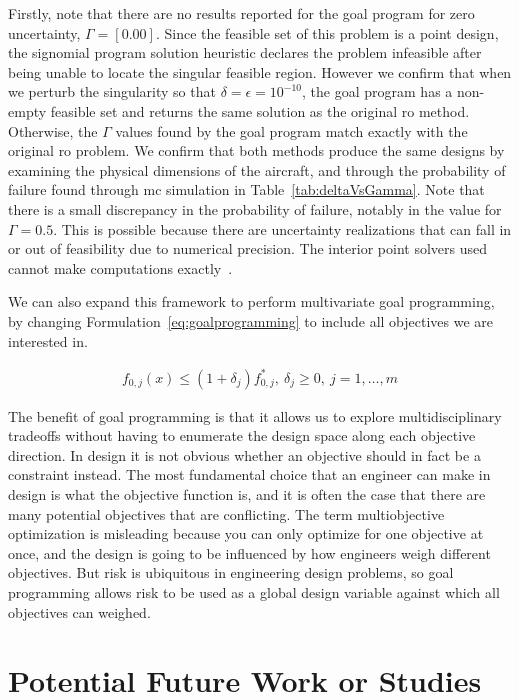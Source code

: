 Firstly, note that there are no results reported for the goal program
for zero uncertainty, $\Gamma = [0.00]$.
Since the feasible set of this problem is a point design, the signomial program
solution heuristic declares the problem infeasible after being
unable to locate the singular feasible region. However we confirm that when we perturb
the singularity so that
$\delta = \epsilon = 10^{-10}$, the goal program has a non-empty feasible set and
returns the same solution as the original \gls{ro} method.
Otherwise, the $\Gamma$ values found by the goal program match exactly
with the original \gls{ro} problem. We confirm that both methods produce
the same designs by examining the physical dimensions of the aircraft, and through the probability
of failure found through \gls{mc} simulation in Table~\ref{tab:deltaVsGamma}.
Note that there is a small discrepancy
in the probability of failure, notably in the value for $\Gamma = 0.5$. This is
possible because there are uncertainty realizations that can fall
in or out of feasibility due to numerical precision. The interior point solvers
used cannot make computations exactly~\cite{Nesterov1994}.

We can also expand this framework to perform multivariate goal programming,
by changing Formulation~\ref{eq:goalprogramming} to include all
objectives we are interested in.

\begin{align*}
    f_{0,j}(x) \leq (1+\delta_j) f^*_{0,j},~\delta_j \geq 0,~j = 1,\ldots, m
    \label{eq:multigoal}
\end{align*}

The benefit of goal programming is that it allows us to explore multidisciplinary tradeoffs without
having to enumerate the design space along each objective direction.
In design it is not obvious whether an objective should in fact be a constraint instead. The most
fundamental choice that an engineer can make in design is what the objective function is, and it is
often the case that there are many potential objectives that are conflicting.
The term multiobjective optimization is misleading
because you can only optimize for one objective at once,
and the design is going to be influenced by how engineers weigh different objectives.
But risk is ubiquitous in engineering design problems, so goal programming allows risk to be used as
a global design variable against which all objectives can weighed.

\section{Potential Future Work or Studies}

